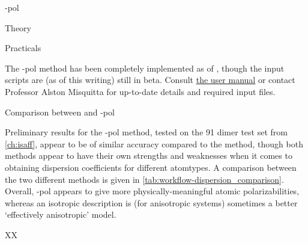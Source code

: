 \begin{subsubsection}{\isa-pol}
\begin{paragraph}{Theory}
\end{paragraph}
\begin{paragraph}{Practicals}

The \isa-pol method has been completely implemented as of , though
the input scripts are (as of this writing) still in beta. Consult 
\href{http://www-stone.ch.cam.ac.uk/programs/camcasp.html}{the \camcasp user
manual} or contact Professor Alston Misquitta for up-to-date details and required input files.

\end{paragraph}

\end{subsubsection}
\begin{subsubsection}{Comparison between \idma and \isa-pol}
\label{sec:workflow-dispersion_comparison}


Preliminary results for the \isa-pol method, tested on the 91 dimer test set
from \cref{ch:isaff},
appear to be of similar accuracy compared to the \idma method, though both
methods appear to have their own strengths and weaknesses when it comes to
obtaining dispersion coefficients for different atomtypes. A comparison
between the two different methods is given in
\cref{tab:workflow-dispersion_comparison}. Overall, \isa-pol appears to give
more physically-meaningful atomic polarizabilities, whereas an isotropic \idma
description is (for
anisotropic systems) sometimes a better `effectively anisotropic'
model.\footnotemark{ }


\begin{table}
\centering
\begin{tabu}{XX}


\end{tabu}
\end{table}
\end{subsubsection}
